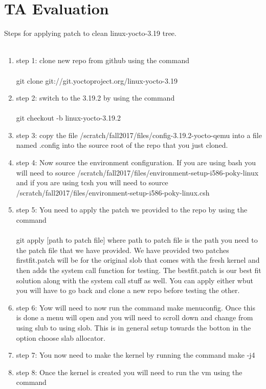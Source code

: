 \documentclass[letterpaper,10pt,titlepage]{article}
\begin{document}
\section{TA Evaluation}
Steps for applying patch to clean linux-yocto-3.19 tree.\\\\
\begin{enumerate}
\item{step 1: }
   clone new repo from github using the command\\\\
   git clone git://git.yoctoproject.org/linux-yocto-3.19
\item{step 2: }
   switch to the 3.19.2 by using the command\\\\
   git checkout -b linux-yocto-3.19.2
\item{step 3: }
   copy the file /scratch/fall2017/files/config-3.19.2-yocto-qemu into a file 
   named .config into the source root of the repo that you just cloned.
\item{step 4: }
   Now source the environment configuration. If you are using bash you will 
   need to source /scratch/fall2017/files/environment-setup-i586-poky-linux 
   and if you are using tcsh you will need  to source 
   /scratch/fall2017/files/environment-setup-i586-poky-linux.csh
\item{step 5: }
   You need to apply the patch we provided to the repo by using the command\\\\
   git apply [path to patch file] where path to patch file is the path you need 
   to the patch file that we have provided. We have provided two patches 
   firstfit.patch will be for the original slob that comes with the fresh kernel 
   and then adds the system call function for testing. The bestfit.patch 
   is our best fit solution along with the system call stuff as well. You can 
   apply either wbut you will have to go back and clone a new repo before testing 
   the other. 
\item{step 6: } 
   Yow will need to now run the command make menuconfig. Once this is done a 
   menu will open and you will need to scroll down and change from using slub 
   to using slob. This is in general setup towards the botton in the option 
   choose slab allocator.
\item{step 7: }
   You now need to make the kernel by running the command make -j4 
\item{step 8: }
   Once the kernel is created you will need to run the vm using the command\\\\

\end{enumerate}
\end{document}
